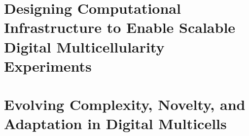 

\part{Designing Computational Infrastructure to Enable Scalable Digital Multicellularity Experiments} \label{part:infrastructure}





\part{Evolving Complexity, Novelty, and Adaptation in Digital Multicells} \label{part:experiments}





